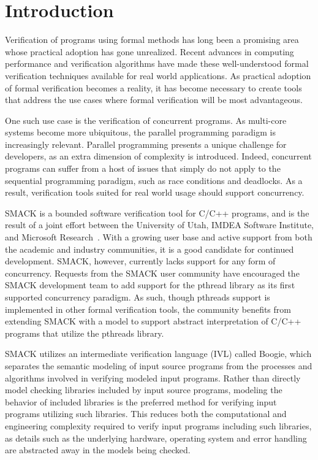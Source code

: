\chapter{Introduction}\label{ch:introduction}

Verification of programs using formal methods has long been a
promising area whose practical adoption has gone unrealized.  Recent
advances in computing performance and verification algorithms have
made these well-understood formal verification techniques available
for real world applications.  As practical adoption of formal
verification becomes a reality, it has become necessary to create
tools that address the use cases where formal verification will
be most advantageous. 

One such use case is the verification of concurrent programs.  As
multi-core systems become more ubiquitous, the parallel programming
paradigm is increasingly relevant.  Parallel programming presents a
unique challenge for developers, as an extra dimension of complexity
is introduced.  Indeed, concurrent programs can suffer from a host of
issues that simply do not apply to the sequential programming
paradigm, such as race conditions and deadlocks.  As a result,
verification tools suited for real world usage should support
concurrency.

SMACK is a bounded software verification tool for C/C++ programs, and
is the result of a joint effort between the University of Utah, IMDEA
Software Institute, and Microsoft Research~\cite{smack}.  With a
growing user base and active support from both the academic and
industry communities, it is a good candidate for continued
development.  SMACK, however, currently lacks support for any form of
concurrency.  Requests from the SMACK user community have encouraged
the SMACK development team to add support for the pthread library as
its first supported concurrency paradigm.   As such, though pthreads
support is implemented in other formal verification tools, the
community benefits from extending SMACK with a model to support
abstract interpretation of C/C++ programs that utilize the pthreads
library.  

SMACK utilizes an intermediate verification language (IVL) called
Boogie, which separates the semantic modeling of input source programs
from the processes and algorithms involved in verifying modeled input
programs.  Rather than directly model checking libraries included by
input source programs, modeling the behavior of included libraries is
the preferred method for verifying input programs utilizing such
libraries.  This reduces both the computational and engineering
complexity required to verify input programs including such libraries,
as details such as the underlying hardware, operating system and error
handling are abstracted away in the models being checked.

